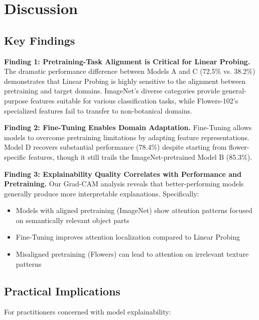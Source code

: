 \documentclass[11pt,a4paper]{article}
\begin{document}
\section{Discussion}

\subsection{Key Findings}

\textbf{Finding 1: Pretraining-Task Alignment is Critical for Linear Probing.}
The dramatic performance difference between Models A and C (72.5\% vs. 38.2\%) demonstrates that Linear Probing is highly sensitive to the alignment between pretraining and target domains. ImageNet's diverse categories provide general-purpose features suitable for various classification tasks, while Flowers-102's specialized features fail to transfer to non-botanical domains.

\textbf{Finding 2: Fine-Tuning Enables Domain Adaptation.}
Fine-Tuning allows models to overcome pretraining limitations by adapting feature representations. Model D recovers substantial performance (78.4\%) despite starting from flower-specific features, though it still trails the ImageNet-pretrained Model B (85.3\%).

\textbf{Finding 3: Explainability Quality Correlates with Performance and Pretraining.}
Our Grad-CAM analysis reveals that better-performing models generally produce more interpretable explanations. Specifically:
\begin{itemize}
    \item Models with aligned pretraining (ImageNet) show attention patterns focused on semantically relevant object parts
    \item Fine-Tuning improves attention localization compared to Linear Probing
    \item Misaligned pretraining (Flowers) can lead to attention on irrelevant texture patterns
\end{itemize}

\subsection{Practical Implications}

For practitioners concerned with model explainability:
\end{document}

